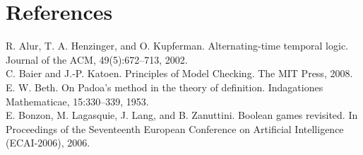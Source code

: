 \documentclass[14pt, a4paper]{article}
\begin{document}
			
			\section{References}



\begin{bibliography}{9}


R. Alur, T. A. Henzinger, and O. Kupferman. Alternating-time
temporal logic. Journal of the ACM, 49(5):672–713, 2002.\\
C. Baier and J.-P. Katoen. Principles of Model Checking. The
MIT Press, 2008.\\
E. W. Beth. On Padoa’s method in the theory of definition.
Indagationes Mathematicae, 15:330–339, 1953.\\
E. Bonzon, M. Lagasquie, J. Lang, and B. Zanuttini. Boolean
games revisited. In Proceedings of the Seventeenth European
Conference on Artificial Intelligence (ECAI-2006), 2006.\\
\end{bibliography}

				
	

	
\end{document}
